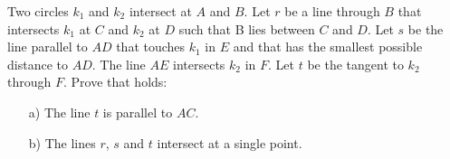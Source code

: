 Two circles $k_1$ and $k_2$ intersect at $A$ and $B$. Let $r$ be a line through $B$ that
intersects $k_1$ at $C$ and $k_2$ at $D$ such that B lies between $C$ and $D$.
Let $s$ be the line parallel to $AD$ that touches $k_1$ in $E$ and that has the smallest
possible distance to $AD$. The line $AE$ intersects $k_2$ in $F$.
Let $t$ be the tangent to $k_2$ through $F$. Prove that holds:
\begin{enumerate}
    \item[a)] The line $t$ is parallel to $AC$.
    \item[b)] The lines $r$, $s$ and $t$ intersect at a single point.
\end{enumerate}
